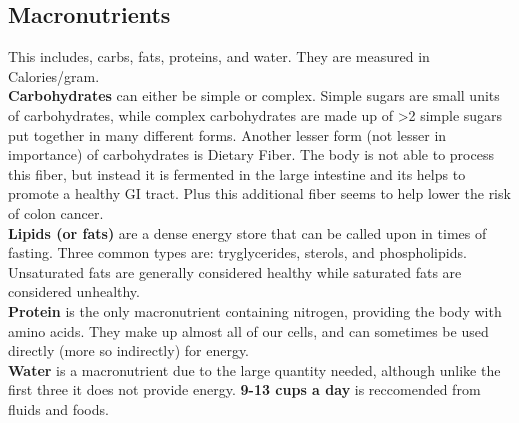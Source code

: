\documentclass[letterpaper, 11pt]{article}
\begin{document}
\subsection{Macronutrients}
\label{sec:org47794b9}
This includes, carbs, fats, proteins, and water. They are measured in Calories/gram.\\
\textbf{Carbohydrates} can either be simple or complex. Simple sugars are small units of carbohydrates, while complex carbohydrates are made up of >2 simple sugars put together in many different forms. Another lesser form (not lesser in importance) of carbohydrates is Dietary Fiber. The body is not able to process this fiber, but instead it is fermented in the large intestine and its helps to promote a healthy GI tract. Plus this additional fiber seems to help lower the risk of colon cancer.\\
\textbf{Lipids (or fats)} are a dense energy store that can be called upon in times of fasting. Three common types are: tryglycerides, sterols, and phospholipids. Unsaturated fats are generally considered healthy while saturated fats are considered unhealthy.\\
\textbf{Protein} is the only macronutrient containing nitrogen, providing the body with amino acids. They make up almost all of our cells, and can sometimes be used directly (more so indirectly) for energy.\\
\textbf{Water} is a macronutrient due to the large quantity needed, although unlike the first three it does not provide energy. \textbf{9-13 cups a day} is reccomended from fluids and foods.\\
\end{document}
